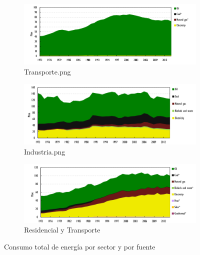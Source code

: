 \documentclass[]{article}
\begin{document}

\begin{figure}[h!]
	\centering
	\begin{subfigure}[b]{1\textwidth}
		\includegraphics[width=\textwidth]{Transporte}
		\caption{Transporte.png}
		\label{fig:Transporte}
	\end{subfigure}
	\begin{subfigure}[b]{1\textwidth}
		\includegraphics[width=\textwidth]{Industria}
		\caption{Industria.png}
		\label{fig:Industria}
	\end{subfigure}
	\begin{subfigure}[b]{1\textwidth}
		\includegraphics[width=\textwidth]{ResidencialComercial.png}
		\caption{Residencial y Transporte}
		\label{fig:Residencial}
	\end{subfigure}
	\caption{Consumo total de energía por sector y por fuente}\label{fig:sectores}
\end{figure}
\end{document}
